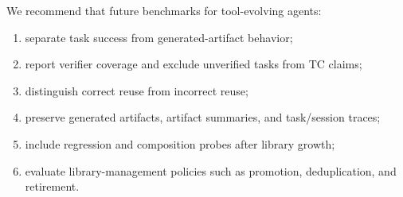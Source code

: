 \documentclass[sigconf,anonymous,review,natbib=false]{acmart}
\begin{document}
\begin{tcolorbox}[title=Reusable Evaluation Practices, colframe=black!70, colback=gray!5, boxrule=0.5pt]
We recommend that future benchmarks for tool-evolving agents:
\begin{enumerate}[noitemsep,leftmargin=1.2em]
  \item separate task success from generated-artifact behavior;
  \item report verifier coverage and exclude unverified tasks from TC claims;
  \item distinguish correct reuse from incorrect reuse;
  \item preserve generated artifacts, artifact summaries, and task/session traces;
  \item include regression and composition probes after library growth;
  \item evaluate library-management policies such as promotion, deduplication, and retirement.
\end{enumerate}
\end{tcolorbox}



\end{document}
